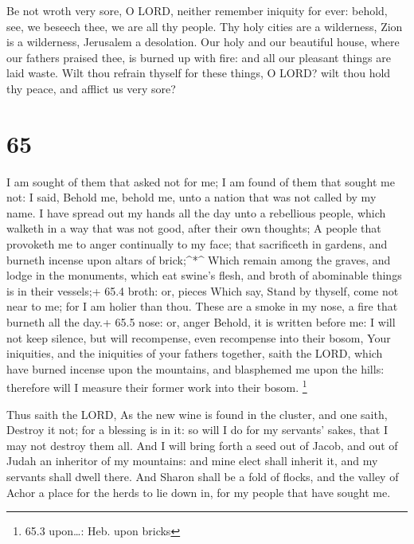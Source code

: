  Be not wroth very sore, O LORD, neither remember iniquity
for ever: behold, see, we beseech thee, we are all thy people.
 Thy holy cities are a wilderness, Zion is a wilderness,
Jerusalem a desolation.  Our holy and our beautiful house,
where our fathers praised thee, is burned up with fire: and all our
pleasant things are laid waste.  Wilt thou refrain thyself
for these things, O LORD? wilt thou hold thy peace, and afflict us very
sore?

\hypertarget{section-64}{%
\section{65}\label{section-64}}

 I am sought of them that asked not for me; I am found of
them that sought me not: I said, Behold me, behold me, unto a nation
that was not called by my name.  I have spread out my hands
all the day unto a rebellious people, which walketh in a way that was
not good, after their own thoughts;  A people that provoketh
me to anger continually to my face; that sacrificeth in gardens, and
burneth incense upon altars of brick;\^{}*\^{}  Which remain
among the graves, and lodge in the monuments, which eat swine's flesh,
and broth of abominable things is in their vessels;+ 65.4 broth: or,
pieces  Which say, Stand by thyself, come not near to me;
for I am holier than thou. These are a smoke in my nose, a fire that
burneth all the day.+ 65.5 nose: or, anger  Behold, it is
written before me: I will not keep silence, but will recompense, even
recompense into their bosom,  Your iniquities, and the
iniquities of your fathers together, saith the LORD, which have burned
incense upon the mountains, and blasphemed me upon the hills: therefore
will I measure their former work into their bosom. \footnote{65.3
  upon\ldots: Heb. upon bricks}

 Thus saith the LORD, As the new wine is found in the
cluster, and one saith, Destroy it not; for a blessing is in it: so will
I do for my servants' sakes, that I may not destroy them all.
 And I will bring forth a seed out of Jacob, and out of
Judah an inheritor of my mountains: and mine elect shall inherit it, and
my servants shall dwell there.  And Sharon shall be a fold
of flocks, and the valley of Achor a place for the herds to lie down in,
for my people that have sought me.

